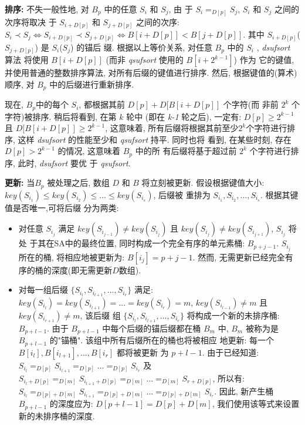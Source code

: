 \documentclass{ws-ijprai}
\begin{document}
\begin{arabiclist}
\item \textbf{排序:} 不失一般性地, 对 $B_p$ 中的任意 $S_i$ 和 $S_j$, 由
  于 $S_i =_{D[p]} S_j$, $S_i$ 和 $S_j$ 之间的次序将取决
  于 $S_{i+D[p]}$ 和 $S_{j+D[p]}$ 之间的次序:
  $S_i \prec S_j \iff S_{i+D[p]} \prec S_{j+D[p]} \iff B[i+D[p]] <
  B[j+D[p]]$. 其中 $S_{i+D[p]}$($S_{j+D[p]}$) 是 $S_i$($S_j$) 的锚后
  缀. 根据以上等价关系, 对任意 $B_p$ 中的 $S_i$ , \emph{dsufsort} 算法
  将使用 $B[i+D[p]]$ (而非 \emph{qsufsort} 使用的 $B[i+2^{k-1}]$) 作为
  它的键值, 并使用普通的整数排序算法, 对所有后缀的键值进行排序. 然后,
  根据键值的(算术)顺序, 对 $B_p$ 中的后缀进行重新排序.

  现在, $B_p$中的每个 $S_i$, 都根据其前 $D[p] + D[B[i+D[p]]$ 个字符(而
  非前 $2^k$ 个字符)被排序. 稍后将看到, 在第 $k$ 轮中 (即在 \emph{k-1}
  轮之后), 一定有: $D[p] \geq 2^{k-1}$ 且 $D[B[i+D[p]] \geq 2^{k-1}$,
  这意味着, 所有后缀将根据其前至少$2^k$个字符进行排
  序, 这样 \emph{dsufsort} 的性能至少和 \emph{qsufsort} 持平. 同时也将
  看到, 在某些时刻, 存在 $D[p] > 2^{k-1}$ 的情况, 这意味着 $B_p$ 中的所
  有后缀将基于超过前 $2^k$ 个字符进行排序, 此时, \emph{dsufsort} 要优
  于 \emph{qsufsort}.

\item \textbf{更新:} 当$B_p$ 被处理之后, 数组 $D$ 和 $B$ 将立刻被更新.
  假设根据键值大小:
  $key(S_{i_1}) \leq key(S_{i_2}) \leq \dots \leq key(S_{i_s})$, 后缀被
  重排为 $S_{i_1}, S_{i_2},\dots,S_{i_s}$. 根据其键值是否唯一,可将后缀
  分为两类:

\begin{itemize}

\item 对任意 $S_{i_j}$ 满足 $key(S_{i_{j-1}}) \neq
  key(S_{i_j})$ 且 $key(S_{i_j}) \neq key(S_{i_{j+1}})$, $S_{i_j}$ 将处
  于其在SA中的最终位置, 同时构成一个完全有序的单元素桶:
  $B_{p+j-1}$. $S_{i_j}$ 所在的桶, 将相应地被更新为: $B[i_j] = p+j-1$.
  然而, 无需更新已经完全有序的桶的深度(即无需更新$D$数组).

\item 对每一组后缀 $\{S_{i_l}, S_{i_{l+1}},\dots,S_{i_r}\}$ 满足:
  $key(S_{i_l}) = key(S_{i_{l+1}}) = \dots = key(S_{i_r}) = m$,
  $key(S_{i_{l-1}}) \neq m$ 且 $key(S_{i_{r+1}}) \neq m$, 该后缀
  组 $\{S_{i_l}, S_{i_{l+1}},\dots,S_{i_r}\}$ 将构成一个新的未排序桶:
  $B_{p+l-1}$. 由于 $B_{p+l-1}$ 中每个后缀的锚后缀都在桶 $B_m$ 中,
  $B_m$ 被称为是 $B_{p+l-1}$ 的"锚桶". 该组中所有后缀所在的桶也将被相应
  地更新: 每一个 $B[i_l], B[i_{l+1}], \dots, B[i_r]$ 都将被更新
  为 $p+l-1$.  由于已经知道:
  $S_{i_l} =_{D[p]} S_{i_{l+1}} =_{D[p]} \dots =_{D[p]}
  S_{i_r}$ 及
  $S_{i_l+D[p]} =_{D[m]} S_{i_{l+1}+D[p]} =_{D[m]} \dots =_{D[m]}
  S_{r+D[p]}$, 所以有:
  $S_{i_l} =_{D[p]+D[m]} S_{i_{l+1}} =_{D[p]+D[m]} \dots =_{D[p]+D[m]}
  S_{i_r}$.  因此, 新产生桶 $B_{p+l-1}$ 的深度应为: $D[p+l-1] = D[p] +
  D[m]$, 我们使用该等式来设置新的未排序桶的深度.
\end{itemize}
\end{arabiclist}
\end{document}
